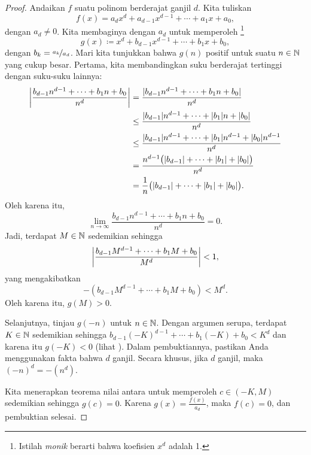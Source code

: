 \begin{proof}
Andaikan $f$ suatu polinom berderajat ganjil $d$.  Kita tuliskan
\begin{equation*}
f(x) = a_d x^d + a_{d-1} x^{d-1} + \cdots + a_1 x + a_0 ,
\end{equation*}
dengan $a_d \neq 0$.  Kita membaginya dengan $a_d$ untuk memperoleh
\emph{}\footnote{Istilah \emph{monik} berarti bahwa
koefisien $x^d$ adalah 1.}
\begin{equation*}
g(x) \coloneqq x^d + b_{d-1} x^{d-1} + \cdots + b_1 x + b_0 ,
\end{equation*}
dengan $b_k = \nicefrac{a_k}{a_d}$.
Mari kita tunjukkan bahwa $g(n)$
positif untuk suatu $n \in {\mathbb{N}}$ yang cukup besar.
Pertama, kita membandingkan suku berderajat tertinggi dengan suku-suku lainnya:
\begin{equation*}
\begin{split}
\left\lvert {\frac{b_{d-1} n^{d-1} + \cdots + b_1 n + b_0}{n^d}} \right\rvert
& =
\frac{\lvert {b_{d-1} n^{d-1} + \cdots + b_1 n + b_0} \rvert}{n^d}
\\
& \leq
\frac{\lvert {b_{d-1}} \rvert n^{d-1} + \cdots + \lvert {b_1} \rvert n + \lvert {b_0} \rvert}{n^d}
\\
& \leq
\frac{\lvert {b_{d-1}} \rvert n^{d-1} + \cdots + \lvert {b_1} \rvert n^{d-1} + \lvert {b_0} \rvert n^{d-1}}{n^d}
\\
& =
\frac{n^{d-1}\bigl(\lvert {b_{d-1}} \rvert + \cdots + \lvert {b_1} \rvert + \lvert {b_0} \rvert\bigr)}{n^d}
\\
& =
\frac{1}{n}
\bigl(\lvert {b_{d-1}} \rvert + \cdots + \lvert {b_1} \rvert + \lvert {b_0} \rvert\bigr) .
\end{split}
\end{equation*}
Oleh karena itu,
\begin{equation*}
\lim_{n\to\infty} \frac{b_{d-1} n^{d-1} + \cdots + b_1 n + b_0}{n^d}
= 0 .
\end{equation*}
Jadi, terdapat $M \in {\mathbb{N}}$ sedemikian sehingga
\begin{equation*}
\left\lvert {\frac{b_{d-1} M^{d-1} + \cdots + b_1 M + b_0}{M^d}} \right\rvert < 1 ,
\end{equation*}
yang mengakibatkan
\begin{equation*}
-(b_{d-1} M^{d-1} + \cdots + b_1 M + b_0) < M^d .
\end{equation*}
Oleh karena itu, $g(M) > 0$.

Selanjutnya, tinjau $g(-n)$ untuk $n \in {\mathbb{N}}$.  Dengan argumen serupa,
terdapat $K \in {\mathbb{N}}$ sedemikian sehingga
$b_{d-1} {(-K)}^{d-1} + \cdots + b_1 (-K) + b_0 < K^d$
dan karena itu $g(-K) < 0$ (lihat ).
Dalam pembuktiannya,
pastikan Anda menggunakan fakta bahwa $d$ ganjil.
Secara khusus, jika $d$ ganjil, maka ${(-n)}^d = -(n^d)$.

Kita menerapkan teorema nilai antara untuk memperoleh
$c \in (-K,M)$ sedemikian sehingga $g(c) = 0$.  Karena $g(x) = \frac{f(x)}{a_d}$,
maka $f(c) = 0$, dan pembuktian selesai.
\end{proof}

